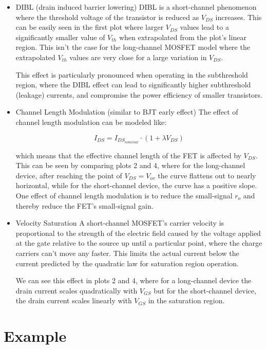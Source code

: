 \documentclass[11pt]{article}
\begin{document}
\begin{itemize}
	\item DIBL (drain induced barrier lowering)
	DIBL is a short-channel phenomenon where the threshold voltage of the transistor is reduced as $V_{DS}$ increases. This can be easily seen in the first plot where larger $V_{DS}$ values lead to a significantly smaller value of $V_{th}$ when extrapolated from the plot's linear region. This isn't the case for the long-channel MOSFET model where the extrapolated $V_{th}$ values are very close for a large variation in $V_{DS}$.
	
	This effect is particularly pronounced when operating in the subthreshold region, where the DIBL effect can lead to significantly higher subthreshold (leakage) currents, and compromise the power efficiency of smaller transistors.

	\item Channel Length Modulation (similar to BJT early effect)
	The effect of channel length modulation can be modeled like:
	
	\begin{equation}
		I_{DS} = I_{DS}_{nominal} \cdot (1 + \lambda V_{DS}) 
	\end{equation} 
	
	which means that the effective channel length of the FET is affected by $V_{DS}$. This can be seen by comparing plots 2 and 4, where for the long-channel device, after reaching the point of $V_{DS} = V_{ov}$ the curve flattens out to nearly horizontal, while for the short-channel device, the curve has a positive slope. One effect of channel length modulation is to reduce the small-signal $r_o$ and thereby reduce the FET's small-signal gain.
	
	\item Velocity Saturation
	A short-channel MOSFET's carrier velocity is proportional to the strength of the electric field caused by the voltage applied at the gate relative to the source up until a particular point, where the charge carriers can't move any faster. This limits the actual current below the current predicted by the quadratic law for saturation region operation.
	
	We can see this effect in plots 2 and 4, where for a long-channel device the drain current scales quadratically with $V_{GS}$ but for the short-channel device, the drain current scales linearly with $V_{GS}$ in the saturation region.

\end{itemize}

\newpage
\appendix
\section{Example} \label{ex}
\end{document}
